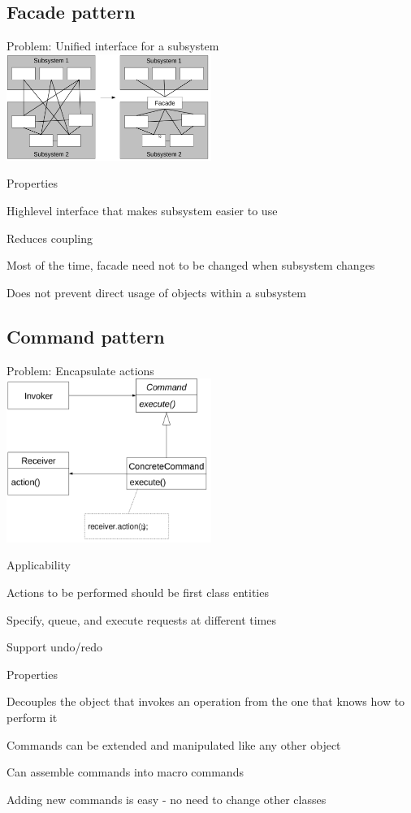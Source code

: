 \documentclass[10pt]{article}
\begin{document}
\subsection{Facade pattern}
\enumstart
	\item Problem: Unified interface for a subsystem
	\\ \includegraphics[width=0.5\textwidth]{facade_pattern.png}
	\item Properties
	\enumstart
		\item Highlevel interface that makes subsystem easier to use
		\item Reduces coupling
		\item Most of the time, facade need not to be changed when subsystem changes
		\item Does not prevent direct usage of objects within a subsystem
	\enumend
\enumend

\subsection{Command pattern}
\enumstart
	\item Problem: Encapsulate actions
	\\ \includegraphics[width=0.5\textwidth]{command_pattern.png}
	\item Applicability
	\enumstart
		\item Actions to be performed should be first class entities
		\item Specify, queue, and execute requests at different times
		\item Support undo/redo
	\enumend
	\item Properties
	\enumstart
		\item Decouples the object that invokes an operation from the one that knows how to perform it
		\item Commands can be extended and manipulated like any other object
		\item Can assemble commands into macro commands
		\item Adding new commands is easy - no need to change other classes
	\enumend
\enumend
\end{document}
